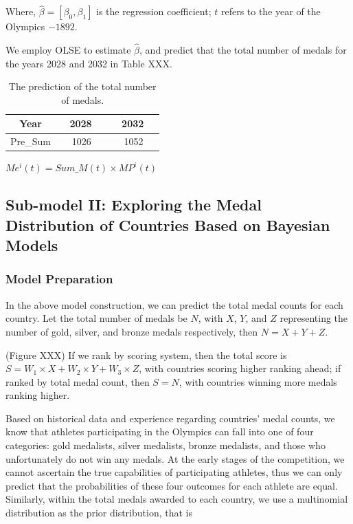 \documentclass{mcmthesis}
\begin{document}
Where, $\hat{\beta} = [\beta_{0}, \beta_{1}]$ is the regression coefficient; $t$ refers to the year of the Olympics $-1892$.

We employ OLSE to estimate $\hat{\beta}$, and predict that the total number of medals for the years 2028 and 2032 in Table XXX.

\begin{table}[h]
\centering
\caption{The prediction of the total number of medals.}
\begin{tabular}{|c|c|c|} 
\hline
Year     & ~ 2028~~ & ~ 2032~~  \\ 
\hline
Pre\_Sum & 1026     & 1052      \\
\hline
\end{tabular}
\end{table}

$ Me^{i}(t) = Sum\_M(t)\times MP^{i}(t)$

\subsection{Sub-model II: Exploring the Medal Distribution of Countries Based on Bayesian Models}
\subsubsection{Model Preparation}
In the above model construction, we can predict the total medal counts for each country. Let the total number of medals be $N$, with $X$, $Y$, and $Z$ representing the number of gold, silver, and bronze medals respectively, then $N=X+Y+Z$.

(Figure XXX)
	If we rank by scoring system, then the total score is $S=W_{1}\times X+W_{2}\times Y+W_{3}\times Z$, with countries scoring higher ranking ahead; if ranked by total medal count, then $S=N$, with countries winning more medals ranking higher.

	Based on historical data and experience regarding countries' medal counts, we know that athletes participating in the Olympics can fall into one of four categories: gold medalists, silver medalists, bronze medalists, and those who unfortunately do not win any medals. At the early stages of the competition, we cannot ascertain the true capabilities of participating athletes, thus we can only predict that the probabilities of these four outcomes for each athlete are equal. Similarly, within the total medals awarded to each country, we use a multinomial distribution as the prior distribution, that is 
\end{document}

